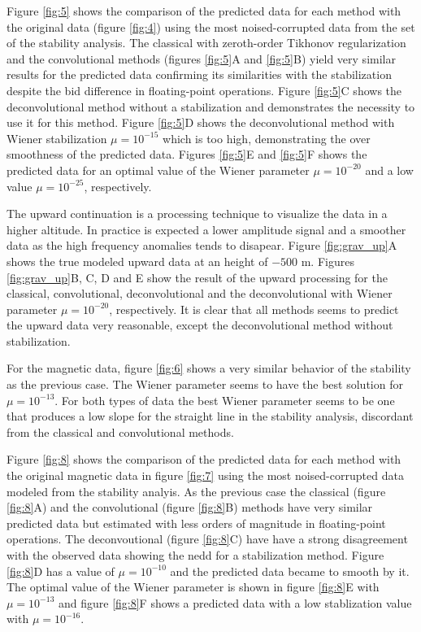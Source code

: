 Figure \ref{fig:5} shows the comparison of the predicted data for each method with the original data (figure \ref{fig:4}) using the most noised-corrupted data from the set of the stability analysis. The classical with zeroth-order Tikhonov regularization and the convolutional methods (figures \ref{fig:5}A and \ref{fig:5}B) yield very similar results for the predicted data confirming its similarities with the stabilization despite the bid difference in floating-point operations. Figure \ref{fig:5}C shows the deconvolutional method without a stabilization and demonstrates the necessity to use it for this method. Figure \ref{fig:5}D shows the deconvolutional method with Wiener stabilization $\mu = 10^{-15}$ which is too high, demonstrating the over smoothness of the predicted data. Figures \ref{fig:5}E and \ref{fig:5}F shows the predicted data for an optimal value of the Wiener parameter $\mu = 10^{-20}$ and a low value $\mu = 10^{-25}$, respectively.

The upward continuation is a processing technique to visualize the data in a higher altitude. In practice is expected a lower amplitude signal and a smoother data as the high frequency anomalies tends to disapear. Figure  \ref{fig:grav_up}A shows the true modeled upward data at an height of $-500$ m. Figures \ref{fig:grav_up}B, C, D and E show the result of the upward processing for the classical, convolutional, deconvolutional and the deconvolutional with Wiener parameter $\mu = 10^{-20}$, respectively. It is clear that all methods seems to predict the upward data very reasonable, except the deconvolutional method without stabilization.

For the magnetic data, figure \ref{fig:6} shows a very similar behavior of the stability as the previous case. The Wiener parameter seems to have the best solution for $\mu = 10^{-13}$. For both types of data the best Wiener parameter seems to be one that produces a low slope for the straight line in the stability analysis, discordant from the classical and convolutional methods. 

Figure \ref{fig:8} shows the comparison of the predicted data for each method with the original magnetic data in figure \ref{fig:7} using the most noised-corrupted data modeled from the stability analyis. As the previous case the classical (figure \ref{fig:8}A) and the convolutional (figure \ref{fig:8}B) methods have very similar predicted data but estimated with less orders of magnitude in floating-point operations. The deconvoutional (figure \ref{fig:8}C) have have a strong disagreement with the observed data showing the nedd for a stabilization method.
Figure \ref{fig:8}D has a value of $\mu = 10^{-10}$ and the predicted data became to smooth by it. The optimal value of the Wiener parameter is shown in figure \ref{fig:8}E with $\mu = 10^{-13}$ and figure \ref{fig:8}F shows a predicted data with a low stablization value with $\mu = 10^{-16}$.

